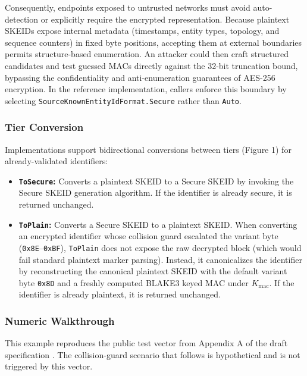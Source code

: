 \documentclass[a4paper,fleqn]{cas-sc}
\providecommand{\tightlist}{%
  \setlength{\itemsep}{0pt}\setlength{\parskip}{0pt}}
\begin{document}
Consequently, endpoints exposed to untrusted networks must avoid
auto-detection or explicitly require the encrypted representation.
Because plaintext SKEIDs expose internal metadata (timestamps, entity
types, topology, and sequence counters) in fixed byte positions,
accepting them at external boundaries permits structure-based
enumeration. An attacker could then craft structured candidates and test
guessed MACs directly against the 32-bit truncation bound, bypassing the
confidentiality and anti-enumeration guarantees of AES-256 encryption.
In the reference implementation, callers enforce this boundary by
selecting \texttt{SourceKnownEntityIdFormat.Secure} rather than
\texttt{Auto}.

\subsubsection{Tier Conversion}\label{tier-conversion}

Implementations support bidirectional conversions between tiers (Figure
1) for already-validated identifiers:

\begin{itemize}
\tightlist
\item
  \textbf{\texttt{ToSecure}:} Converts a plaintext SKEID to a Secure
  SKEID by invoking the Secure SKEID generation algorithm. If the
  identifier is already secure, it is returned unchanged.
\item
  \textbf{\texttt{ToPlain}:} Converts a Secure SKEID to a plaintext
  SKEID. When converting an encrypted identifier whose collision guard
  escalated the variant byte (\texttt{0x8E}--\texttt{0xBF}),
  \texttt{ToPlain} does not expose the raw decrypted block (which would
  fail standard plaintext marker parsing). Instead, it canonicalizes the
  identifier by reconstructing the canonical plaintext SKEID with the
  default variant byte \texttt{0x8D} and a freshly computed BLAKE3 keyed
  MAC under \(K_{\mathrm{mac}}\). If the identifier is already
  plaintext, it is returned unchanged.
\end{itemize}

\subsubsection{Numeric Walkthrough}\label{numeric-walkthrough}

This example reproduces the public test vector from Appendix A of the
draft specification \citep{draft-skid}. The collision-guard scenario
that follows is hypothetical and is not triggered by this vector.
\end{document}
